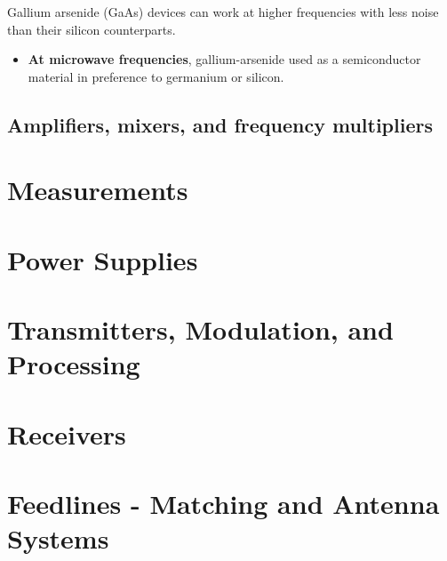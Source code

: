 \documentclass[letterpaper]{article}
\begin{document}
        Gallium arsenide (GaAs) devices can work at higher frequencies with less noise than their silicon counterparts.
        \begin{itemize}
            \item \textbf{At microwave frequencies}, gallium-arsenide used as a semiconductor material in preference to germanium or silicon.
        \end{itemize}

        \newpage

        \subsection{Amplifiers, mixers, and frequency multipliers}

        \newpage

        \section{Measurements}

        \newpage

        \section{Power Supplies}

    \newpage

    \section{Transmitters, Modulation, and Processing}

    \newpage

    \section{Receivers}

    \newpage

    \section{Feedlines - Matching and Antenna Systems}
\end{document}

